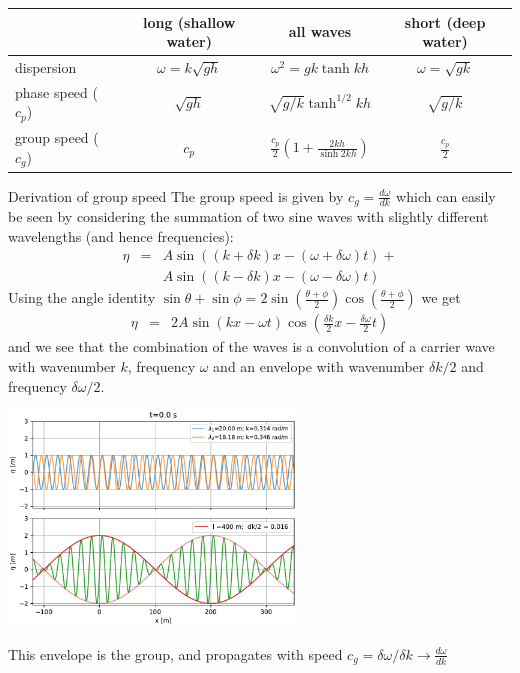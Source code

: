 \begin{table}[hbt]
  \begin{tabular}{l|ccc}
    &long  (shallow water) & all waves& short (deep water) \\
    \hline
    dispersion & $\omega = k \sqrt{gh}$ & $\omega^2 = g k\tanh kh$  &  $\omega = \sqrt{gk}$ \\
    phase speed ($c_p$)& $\sqrt{gh}$ &  $\sqrt{g/k}\tanh^{1/2} kh$ & $\sqrt{g/k}$ \\
    group speed ($c_g$) & $c_p$& $\frac{c_p}{2}\left(1 + \frac{2kh}{\sinh{2kh}}\right)$   & $\frac{c_p}{2}$ 
  \end{tabular}
\end{table}

\begin{derivbox}[label={box:groupspeed}]{Derivation of group speed}
    The group speed is given by $c_g=\frac{d\omega}{dk}$ which can easily be seen by considering the summation of two sine waves with slightly different wavelengths (and hence frequencies):
\begin{eqnarray*}
    \eta &=& A \sin \left( (k+\delta k) x - (\omega + \delta\omega)t\right) +\\
    && A \sin \left( (k-\delta k) x - (\omega - \delta\omega)t\right) 
\end{eqnarray*}
Using the angle identity $\sin\theta + \sin\phi = 2\sin\left(\frac{\theta+\phi}{2} \right)\cos\left(\frac{\theta+\phi}{2} \right)$ we get
\begin{eqnarray*}
    \eta &=& 2A \sin \left( k x - \omega t\right)  \cos \left( \frac{\delta k}{2} x  - \frac{\delta \omega}{2} t\right)
\end{eqnarray*}
and we see that the combination of the waves is a convolution of a carrier wave with wavenumber $k$, frequency $\omega$ and an envelope with wavenumber $\delta k / 2$ and frequency $\delta \omega / 2$.  
\begin{center}
  \includegraphics[width=3in]{figs/Waves/InterferingWavesEnvelope}
\end{center}
This envelope is the group, and propagates with speed $c_g=\delta \omega / \delta k \to \frac{d\omega}{dk}$
\end{derivbox}

